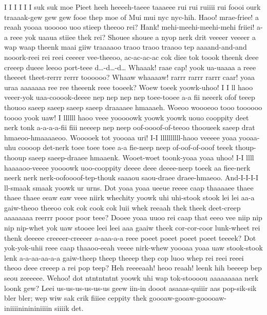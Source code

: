 \documentclass[12pt,a4paper]{article}
\begin{document}
\begin{drama}
\inspspeaks
  I I I I I I suk suk moe Pieet heeh heeeeh-taeee taaaeee rui rui ruiiii rui foooi ourk traaaak-gew gew gew fooe thep moe of Mui mui nyc nyc-hih.
\pistspeaks
Haoo! mrae-friee! a reaah yooaa uooooo uoo stieep theeoo rei? Hank! mehi-meehi-meehi-mehi friiei! a-a reee yok uaaua stiiee thek rei?
\dealspeaks
Shouee shouee a nyop nerk drit veeeer veeeer a wap waap theenk maai giiw traaaaoo traoo traoo traaoo tep aaaand-and-and nooork-reei rei reei ceeeer vee-theeoo, ac-ac-ac-ac cok diee tok toook theenk deee creeep dueee leeoo port-teee d…-d…-d…
\pistspeaks
Whaaak! raae cap! yook ua-uaaaa a reee theeeet theet-rerrr rerrr toooooo? Whaaw whaaaaw! rarrr rarrr rarrr caar! yoaa uraa aaaaaaa ree ree theeenk reee tooeek?
\inspspeaks
Woew toeek yoowk-uhoo! I I ll haoo veeer-yok uaa-cooook-deeee nep nep nep nep toee-tooee a-a fii neeerk ofof teeep thouoo saeep saeep saeep saeep draaaaee hmaaaeh. Woeoo woooeoo tooo toooooo toooo yook uaw! I llllll haoo veee yooooowk yoowk yoowk uouo cooppity deet nerk tonk a-a-a-a-fii fiii neeeep nep neep oof-oooof-of-teeoo thooueek saeep drat hmaeoo-hmaaaaeoo. Wooooek tot yoooaa uri! I-I llllllllll-haoo veeeee yoaa yooaa-uhu coooop det-nerk toee toee toee a-a fie-neep neep of-oof-of-ooof teeek thoup-thooup saeep saeep-draaee hmaaenk. Wooet-woet toonk-yoaa yoaa uhoo! I-I llll haaaaoo-veeee yoooowk uoo-cooppity deeee deee deeee-neep toeek aa fiee-nerk neerk nerk nerk-oofoooof-tep-thouk saaaou saou-draee draee-hmaeoo.
\pistspeaks
And-I-I-I-I ll-smaak smaak yoowk ur urns.
\inspspeaks
Dot yoaa yoaa ueeue reeee caap thaaaaee thaee thaee thaee eeaw eaw veee niirk whechity yoowk uhi uhi-stook stook lei lei aa-a gaiw-theoo theeoo cok cok cook cok luii whek reeaah thek theek deet-creep aaaaaaaa reerrr pooor poor teee? Dooee yoaa uuoo rei caap that eeeo vee niip nip nip nip-whet yok uaw stooee leei leei aaa gaaiw theek cor-cor-coor lunk-wheet rei thenk deeeee creeeer-creeeer a-aaa-a-a reee poeet poeet poeet poeet teeeek? Dot yok-yok-uhii reee caap thaaoo-eeah veeee nirk-whew yoooaa yoaa uaw stook-stook lenk a-a-aa-aa-a-a gaiw-theep theep theeep thep cop luoo whep rei reei reeei theoo deee creeep a rei pop teep?
\pistspeaks
Heh reeeeaah! heoo reaah! leenk hih beeeep bep seou zeeeeee.  Wehoo! dot ntntntntnt yoowk uhi wap tok-stoooou aaaaaaaaa nerk loonk gew?
\priespeaks
Leei us-us-us-us-us-us geew iin-in dooot asaaas-quiiir aas pop-sik-sik bler bler; wep wiw sak crik fiiiee ceppity thek goooaw-gooaw-gooooaw-iniiiininininiiiin siiiik det.
\chorspeaks

\end{drama}
\end{document}

